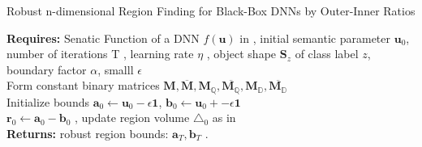 \newpage
\begin{algorithm}[h] 
\caption{Robust n-dimensional Region Finding for Black-Box DNNs by Outer-Inner Ratios}\label{alg: black-sup}
\small
\SetAlgoLined
  \textbf{Requires: } Senatic Function of a DNN $f(\mathbf{u})$ in \eqLabel{\ref{eq:f-sup}}, initial semantic parameter $\mathbf{u}_{0}$, number of iterations T , learning rate $\eta$ , object shape $\mathbf{S}_{z}$ of class label $z$, boundary factor $\alpha$, smalll $\epsilon$ \\
   Form constant binary matrices $\mathbf{M}, \overline{\mathbf{M}},\mathbf{M}_{\mathbb{Q}},\overline{\mathbf{M}_{\mathbb{Q}}}, \mathbf{M}_{\mathbb{D}},\overline{\mathbf{M}_{\mathbb{D}}} $ \\
   Initialize bounds $\mathbf{a}_{0}\leftarrow \mathbf{u}_{0} - \epsilon \mathbf{1} $, $\mathbf{b}_{0} \leftarrow \mathbf{u}_{0}+- \epsilon \mathbf{1}$ \\
    $\mathbf{r}_{0} \leftarrow \mathbf{a}_{0}-\mathbf{b}_{0} $ , update region volume $ \triangle_{0} $ as in \eqLabel{\ref{eq:n-vol-sup}}\\
    \textbf{Returns: }robust region bounds: $ \mathbf{a}_{T},\mathbf{b}_{T}$ .
\end{algorithm}

